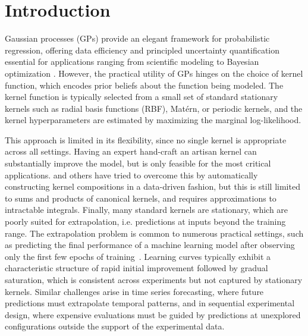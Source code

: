 \documentclass{article}
\begin{document}
\section{Introduction}
\label{sec:introduction}
Gaussian processes (GPs) provide an elegant framework for probabilistic regression, offering data efficiency and principled uncertainty quantification essential for applications ranging from scientific modeling to Bayesian optimization \citep{rasmussen2006gaussian}.
However, the practical utility of GPs hinges on the choice of kernel function, which encodes prior beliefs about the function being modeled.
The kernel function is typically selected from a small set of standard stationary kernels such as radial basis functions (RBF), Mat\'ern, or periodic kernels, and the kernel hyperparameters are estimated by maximizing the marginal log-likelihood.

This approach is limited in its flexibility, since no single kernel is appropriate across all settings. Having an expert hand-craft an artisan kernel can substantially improve the model, but is only feasible for the most critical applications.
\citet{duvenaud2013kernelsearch}  %
and others have tried to overcome this by automatically constructing kernel compositions in a data-driven fashion,
but this is still limited to sums and products of canonical kernels, and requires approximations to intractable integrals.  %
Finally, many standard kernels are stationary, which
are poorly suited for extrapolation, i.e. predictions at inputs beyond the training range.
The extrapolation problem is common to numerous practical settings, such as predicting the final performance of a machine learning model after observing only the first few epochs of training~\citep{swersky2014freeze, lin2025lkgp}.
Learning curves typically exhibit a characteristic structure of rapid initial improvement followed by gradual saturation, which is consistent across experiments but not captured by stationary kernels.
Similar challenges arise in time series forecasting, where future predictions must extrapolate temporal patterns, and in sequential experimental design, where expensive evaluations must be guided by predictions at unexplored configurations outside the support of the experimental data.
\end{document}
